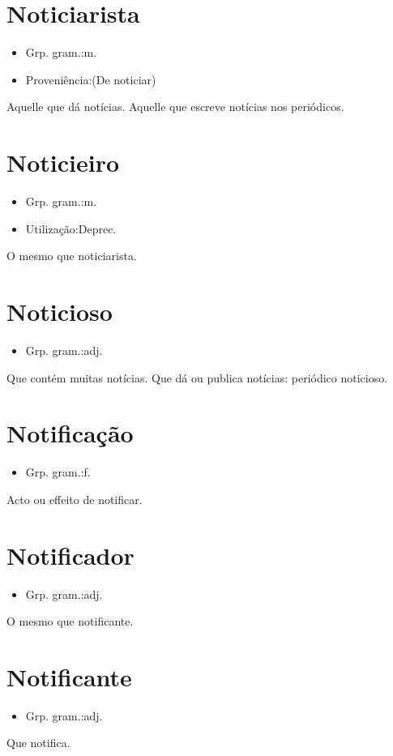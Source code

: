\section{Noticiarista}
\begin{itemize}
\item {Grp. gram.:m.}
\end{itemize}
\begin{itemize}
\item {Proveniência:(De \textunderscore noticiar\textunderscore )}
\end{itemize}
Aquelle que dá notícias.
Aquelle que escreve notícias nos periódicos.
\section{Noticieiro}
\begin{itemize}
\item {Grp. gram.:m.}
\end{itemize}
\begin{itemize}
\item {Utilização:Deprec.}
\end{itemize}
O mesmo que \textunderscore noticiarista\textunderscore .
\section{Noticioso}
\begin{itemize}
\item {Grp. gram.:adj.}
\end{itemize}
Que contém muitas notícias.
Que dá ou publica notícias: \textunderscore periódico noticioso\textunderscore .
\section{Notificação}
\begin{itemize}
\item {Grp. gram.:f.}
\end{itemize}
Acto ou effeito de notificar.
\section{Notificador}
\begin{itemize}
\item {Grp. gram.:adj.}
\end{itemize}
O mesmo que \textunderscore notificante\textunderscore .
\section{Notificante}
\begin{itemize}
\item {Grp. gram.:adj.}
\end{itemize}
Que notifica.
